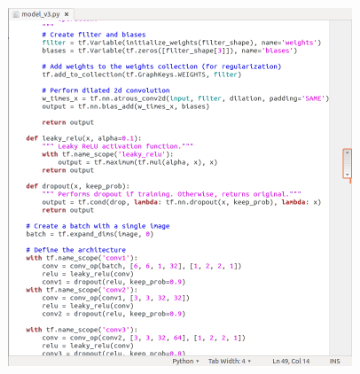 \documentclass{beamer}
\begin{document}
\begin{frame}
\begin{figure}[h]
\begin{subfigure}{0.5\textwidth}
				\includegraphics[width=\textwidth]{plots/code.png}
			\end{subfigure}
		\end{figure}
	\end{frame}
	
\end{document}
